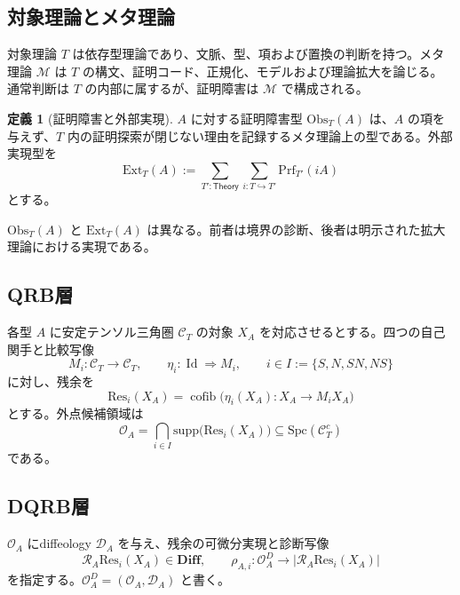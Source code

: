 \documentclass[a4paper,11pt]{ltjsarticle}
\theoremstyle{definition}
\newtheorem{definition}{定義}[section]
\theoremstyle{plain}
\newcommand{\Diff}{\mathbf{Diff}}
\newcommand{\Obs}{\mathrm{Obs}}
\newcommand{\Ext}{\mathrm{Ext}}
\newcommand{\Prf}{\mathrm{Prf}}
\newcommand{\Res}{\mathrm{Res}}
\newcommand{\Spc}{\mathrm{Spc}}
\newcommand{\supp}{\mathrm{supp}}
\newcommand{\cofib}{\operatorname{cofib}}
\newcommand{\Id}{\operatorname{Id}}
\newcommand{\Meta}{\mathcal M}
\newcommand{\Theory}{\mathsf{Theory}}
\begin{document}
\subsection{対象理論とメタ理論}

対象理論 $T$ は依存型理論であり、文脈、型、項および置換の判断を持つ。メタ理論 $\Meta$ は $T$ の構文、証明コード、正規化、モデルおよび理論拡大を論じる。通常判断は $T$ の内部に属するが、証明障害は $\Meta$ で構成される。

\begin{definition}[証明障害と外部実現]
$A$ に対する証明障害型 $\Obs_T(A)$ は、$A$ の項を与えず、$T$ 内の証明探索が閉じない理由を記録するメタ理論上の型である。外部実現型を
\begin{equation}
 \Ext_T(A)
 :=
 \sum_{T':\Theory}
 \sum_{i:T\hookrightarrow T'}
 \Prf_{T'}(iA)
 \label{eq:external-realization}
\end{equation}
とする。
\end{definition}

$\Obs_T(A)$ と $\Ext_T(A)$ は異なる。前者は境界の診断、後者は明示された拡大理論における実現である。

\subsection{QRB層}

各型 $A$ に安定テンソル三角圏 $\mathcal C_T$ の対象 $X_A$ を対応させるとする。四つの自己関手と比較写像
\begin{equation}
 M_i:\mathcal C_T\longrightarrow\mathcal C_T,
 \qquad
 \eta_i:\Id\Longrightarrow M_i,
 \qquad
 i\in I:=\{S,N,SN,NS\}
 \label{eq:four-comparisons}
\end{equation}
に対し、残余を
\begin{equation}
 \Res_i(X_A)=
 \cofib\bigl(\eta_i(X_A):X_A\to M_iX_A\bigr)
 \end{equation}
とする。外点候補領域は
\begin{equation}
 \mathcal O_A=
 \bigcap_{i\in I}\supp\bigl(\Res_i(X_A)\bigr)
 \subseteq\Spc(\mathcal C_T^c)
 \label{eq:qrb-locus}
\end{equation}
である\cite{ChibaQRB2026,balmer}。

\subsection{DQRB層}

$\mathcal O_A$ にdiffeology $\mathcal D_A$ を与え、残余の可微分実現と診断写像
\begin{equation}
 \mathcal R_A\Res_i(X_A)\in\Diff,
 \qquad
 \rho_{A,i}:\mathcal O_A^D
 \longrightarrow
 |\mathcal R_A\Res_i(X_A)|
 \label{eq:dqrb-realization}
\end{equation}
を指定する。$\mathcal O_A^D=(\mathcal O_A,\mathcal D_A)$ と書く。
\end{document}
